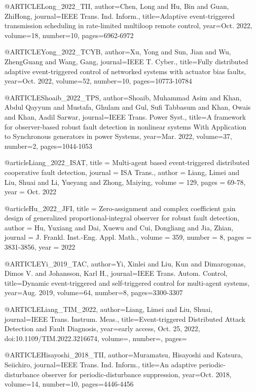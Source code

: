 @ARTICLE{Long_2022_TII,
  author={Chen, Long and Hu, Bin and Guan, ZhiHong},
  journal={IEEE Trans. Ind. Inform.},
  title={Adaptive event-triggered transmission scheduling in rate-limited multiloop remote control}, 
  year={Oct. 2022},
  volume={18},
  number={10},
  pages={6962-6972}}
  
@ARTICLE{Yong_2022_TCYB,
  author={Xu, Yong and Sun, Jian and Wu, ZhengGuang and Wang, Gang},
  journal={IEEE T. Cyber.}, 
  title={Fully distributed adaptive event-triggered control of networked systems with actuator bias faults}, 
  year={Oct. 2022},
  volume={52},
  number={10},
  pages={10773-10784}}
  
@ARTICLE{Shoaib_2022_TPS,
  author={Shoaib, Muhammad Asim and Khan, Abdul Qayyum and Mustafa, Ghulam and Gul, Sufi Tabbasum and Khan, Owais and Khan, Aadil Sarwar},
  journal={IEEE Trans. Power Syst.}, 
  title={A framework for observer-based robust fault detection in nonlinear systems With Application to Synchronous generators in power Systems}, 
  year={Mar. 2022},
  volume={37},
  number={2},
  pages={1044-1053}}
  
@article{Liang_2022_ISAT,
  title = {Multi-agent based event-triggered distributed cooperative fault detection},
  journal = {ISA Trans.},
  author = {Liang, Limei  and Liu, Shuai and Li, Yueyang and Zhong, Maiying},
  volume = {129},
  pages = {69-78},
  year = {Oct. 2022}}

@article{Hu_2022_JFI,
 title = {Zero-assignment and complex coefficient gain design of generalized proportional-integral observer for robust fault detection},
 author = {Hu, Yuxiang  and Dai, Xuewu and Cui, Dongliang and Jia, Zhian},
 journal = {J. Frankl. Inst.-Eng. Appl. Math.},
 volume = {359},
 number = {8},
 pages = {3831-3856},
 year = {2022}}

@ARTICLE{Yi_2019_TAC,
  author={Yi, Xinlei and Liu, Kun and Dimarogonas, Dimos V. and Johansson, Karl H.},
  journal={IEEE Trans. Autom. Control}, 
  title={Dynamic event-triggered and self-triggered control for multi-agent systems}, 
  year={Aug. 2019},
  volume={64},
  number={8},
  pages={3300-3307}}

@ARTICLE{Liang_TIM_2022,
  author={Liang, Limei and Liu, Shuai},
  journal={IEEE Trans. Instrum. Meas.}, 
  title={Event-triggered Distributed Attack Detection and Fault Diagnosis}, 
  year={early access, Oct. 25, 2022, doi:10.1109/TIM.2022.3216674},
  volume={},
  number={},
  pages={}}




@ARTICLE{Hisayoshi_2018_TII,
  author={Muramatsu, Hisayoshi and Katsura, Seiichiro},
  journal={IEEE Trans. Ind. Inform.}, 
  title={An adaptive periodic-disturbance observer for periodic-disturbance suppression}, 
  year={Oct. 2018},
  volume={14},
  number={10},
  pages={4446-4456}}

